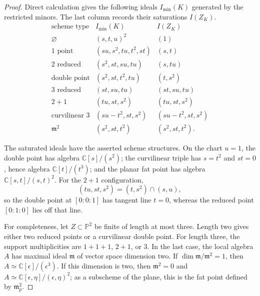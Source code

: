 \documentclass[11pt]{amsart}
\theoremstyle{plain}
\theoremstyle{definition}
\theoremstyle{remark}
\begin{document}
\begin{proof}
{Direct calculation gives the following ideals $I_{\min}(K)$ generated by the restricted minors. The last column records their saturations $I(Z_K)$.}
\[
\begin{array}{c|c|c}
{\text{scheme type}}&{I_{\min}(K)}&{I(Z_K)}\\ \hline
\varnothing&(s,t,u)^2&{(1)}\\
1\text{ point}&(su,s^2,tu,t^2,st)&{(s,t)}\\
2\text{ reduced}&(s^2,st,su,tu)&{(s,tu)}\\
\text{double point}&(s^2,st,t^2,tu)&{(t,s^2)}\\
3\text{ reduced}&(st,su,tu)&{(st,su,tu)}\\
2+1&(tu,st,s^2)&{(tu,st,s^2)}\\
\text{curvilinear }3&(su-t^2,st,s^2)&{(su-t^2,st,s^2)}\\
\mathfrak m^2&(s^2,st,t^2)&{(s^2,st,t^2)}.
\end{array}
\]
{
The saturated ideals have the asserted scheme structures. On the chart $u=1$, the double point has algebra $\mathbb C[s]/(s^2)$; the curvilinear triple has $s=t^2$ and $st=0$, hence algebra $\mathbb C[t]/(t^3)$; and the planar fat point has algebra $\mathbb C[s,t]/(s,t)^2$. For the $2+1$ configuration,
\[
(tu,st,s^2)=(t,s^2)\cap(s,u),
\]
so the double point at $[0:0:1]$ has tangent line $t=0$, whereas the reduced point $[0:1:0]$ lies off that line.

For completeness, let $Z\subset\mathbb P^2$ be finite of length at most three. Length two gives either two reduced points or a curvilinear double point. For length three, the support multiplicities are $1+1+1$, $2+1$, or $3$. In the last case, the local algebra $A$ has maximal ideal $\mathfrak m$ of vector space dimension two. If $\dim\mathfrak m/\mathfrak m^2=1$, then $A\simeq\mathbb C[\epsilon]/(\epsilon^3)$. If this dimension is two, then $\mathfrak m^2=0$ and $A\simeq\mathbb C[\epsilon,\eta]/(\epsilon,\eta)^2$; as a subscheme of the plane, this is the fat point defined by $\mathfrak m_p^2$.

}
\end{proof}
\end{document}
